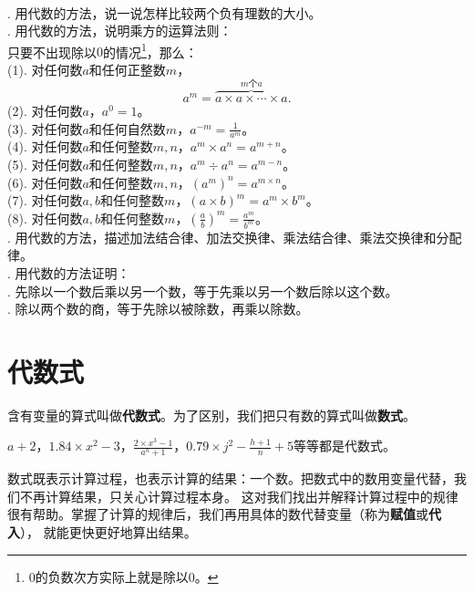 \documentclass[12pt,UTF8,fontset=none]{ctexbook}
\begin{document}
\begin{sk}\label{sk:1-0-0}
    \mbox{}\\
    . 用代数的方法，说一说怎样比较两个负有理数的大小。\\
    . 用代数的方法，说明乘方的运算法则：\\
    \indent \indent 只要不出现除以$0$的情况\footnote{$0$的负数次方实际上就是除以$0$。}，那么：\\
    \indent \indent (1). 对任何数$a$和任何正整数$m$，
    $$a^m = \overbrace{a\times a \times \cdots \times a}^{m\text{个}a}.$$
    \indent \indent (2). 对任何数$a$，$a^0 = 1$。\\
    \indent \indent (3). 对任何数$a$和任何自然数$m$，$a^{-m} = \frac{1}{a^m}$。\\
    \indent \indent (4). 对任何数$a$和任何整数$m,n$，$a^m \times a^n = a^{m+n}$。\\
    \indent \indent (5). 对任何数$a$和任何整数$m,n$，$a^m \div a^n = a^{m-n}$。\\
    \indent \indent (6). 对任何数$a$和任何整数$m,n$，$\left(a^m\right)^n = a^{m\times n}$。\\
    \indent \indent (7). 对任何数$a,b$和任何整数$m$，$(a\times b)^m = a^m \times b^m$。\\
    \indent \indent (8). 对任何数$a,b$和任何整数$m$，$\left(\frac{a}{b}\right)^m = \frac{a^m}{b^m}$。\\
    . 用代数的方法，描述加法结合律、加法交换律、乘法结合律、乘法交换律和分配律。\\
    . 用代数的方法证明：\\
    . 先除以一个数后乘以另一个数，等于先乘以另一个数后除以这个数。\\
    . 除以两个数的商，等于先除以被除数，再乘以除数。\\
\end{sk}

\section{代数式}
含有变量的算式叫做\textbf{代数式}。为了区别，我们把只有数的算式叫做\textbf{数式}。

$a + 2$，$1.84\times x^2 - 3$，$\frac{2\times x^3 - 1}{a^n + 1}$，$0.79\times  j^2 - \frac{h+1}{n} + 5 $等等都是代数式。

数式既表示计算过程，也表示计算的结果：一个数。把数式中的数用变量代替，我们不再计算结果，只关心计算过程本身。
这对我们找出并解释计算过程中的规律很有帮助。掌握了计算的规律后，我们再用具体的数代替变量（称为\textbf{赋值}或\textbf{代入}），
就能更快更好地算出结果。
\end{document}
